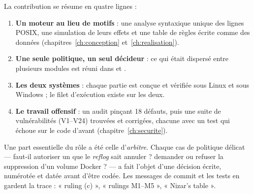 La contribution se résume en quatre lignes :
\begin{enumerate}
  \item \textbf{Un moteur au lieu de motifs} : une analyse syntaxique unique des lignes POSIX,
    une simulation de leurs effets et une table de règles écrite comme des données
    (chapitres~\ref{ch:conception} et~\ref{ch:realisation}).
  \item \textbf{Une seule politique, un seul décideur} : ce qui était dispersé entre
    plusieurs modules est réuni dans  et .
  \item \textbf{Les deux systèmes} : chaque partie est conçue et vérifiée sous Linux et sous
    Windows ; le filet d'exécution existe sur les deux.
  \item \textbf{Le travail offensif} : un audit pinçant 18 défauts, puis une suite de
    vulnérabilités (V1--V24) trouvées et corrigées, chacune avec un test qui échoue sur le
    code d'avant (chapitre~\ref{ch:securite}).
\end{enumerate}

Une part essentielle du rôle a été celle d'\emph{arbitre}. Chaque cas de politique
délicat --- faut-il autoriser un  que le \textit{reflog} sait annuler ?
demander ou refuser la suppression d'un volume Docker ? --- a fait l'objet d'une décision
écrite, numérotée et datée avant d'être codée. Les messages de commit et les tests en
gardent la trace : « ruling (c) », « rulings M1--M5 », « Nizar's table ».
